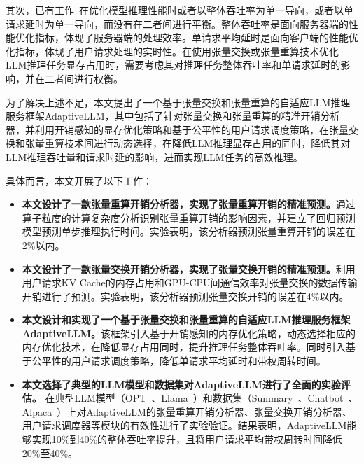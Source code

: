 其次，已有工作~\cite{Swapping, vLLM, SpecInfer}在优化模型推理性能时或者以整体吞吐率为单一导向，或者以单请求延时为单一导向，而没有在二者间进行平衡。整体吞吐率是面向服务器端的性能优化指标，体现了服务器端的处理效率。单请求平均延时是面向客户端的性能优化指标，体现了用户请求处理的实时性。在使用张量交换或张量重算技术优化LLM推理任务显存占用时，需要考虑其对推理任务整体吞吐率和单请求延时的影响，并在二者间进行权衡。

为了解决上述不足，本文提出了一个基于张量交换和张量重算的自适应LLM推理服务框架AdaptiveLLM，其中包括了针对张量交换和张量重算的精准开销分析器，并利用开销感知的显存优化策略和基于公平性的用户请求调度策略，在张量交换和张量重算技术间进行动态选择，在降低LLM推理显存占用的同时，降低其对LLM推理吞吐量和请求时延的影响，进而实现LLM任务的高效推理。

具体而言，本文开展了以下工作：

\begin{itemize} 
    
    \item \textbf{本文设计了一款张量重算开销分析器，实现了张量重算开销的精准预测。}通过算子粒度的计算复杂度分析识别张量重算开销的影响因素，并建立了回归预测模型预测单步推理执行时间。实验表明，该分析器预测张量重算开销的误差在2\%以内。
    
    \item \textbf{本文设计了一款张量交换开销分析器，实现了张量交换开销的精准预测。}利用用户请求KV Cache的内存占用和GPU-CPU间通信效率对张量交换的数据传输开销进行了预测。实验表明，该分析器预测张量交换开销的误差在4\%以内。

    \item \textbf{本文设计和实现了一个基于张量交换和张量重算的自适应LLM推理服务框架AdaptiveLLM。}该框架引入基于开销感知的内存优化策略，动态选择相应的内存优化技术，在降低显存占用同时，提升推理任务整体吞吐率。同时引入基于公平性的用户请求调度策略，降低单请求平均延时和带权周转时间。
    
    \item \textbf{本文选择了典型的LLM模型和数据集对AdaptiveLLM进行了全面的实验评估。} 在典型LLM模型（OPT~\cite{OPT}、Llama~\cite{Llama}）和数据集（Summary~\cite{Summary}、Chatbot~\cite{Chatbot}、Alpaca~\cite{Alpaca}）上对AdaptiveLLM的张量重算开销分析器、张量交换开销分析器、用户请求调度器等模块的有效性进行了实验验证。结果表明，AdaptiveLLM能够实现10\%到40\%的整体吞吐率提升，且将用户请求平均带权周转时间降低20\%至40\%。

\end{itemize}